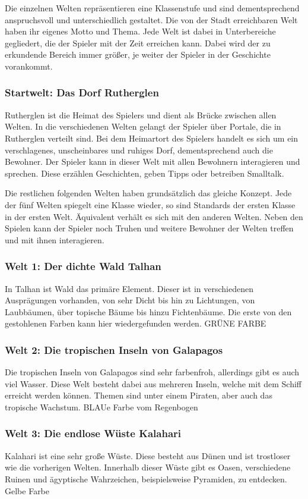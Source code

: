 Die einzelnen Welten repräsentieren eine Klassenstufe und sind dementsprechend anspruchsvoll und unterschiedlich gestaltet. Die von der Stadt erreichbaren Welt haben ihr eigenes Motto und Thema. Jede Welt ist dabei in Unterbereiche gegliedert, die der Spieler mit der Zeit erreichen kann. Dabei wird der zu erkundende Bereich immer größer, je weiter der Spieler in der Geschichte vorankommt. 

\subsubsection{Startwelt: Das Dorf Rutherglen}
	Rutherglen ist die Heimat des Spielers und dient als Brücke zwischen allen Welten. In die verschiedenen Welten gelangt der Spieler über Portale, die in Rutherglen verteilt sind. Bei dem Heimartort des Spielers handelt es sich um ein verschlagenes, unscheinbares und ruhiges Dorf, dementsprechend auch die Bewohner. Der Spieler kann in dieser Welt mit allen Bewohnern interagieren und sprechen. Diese erzählen Geschichten, geben Tipps oder betreiben Smalltalk.
	
	Die restlichen folgenden Welten haben grundsätzlich das gleiche Konzept. Jede der fünf Welten spiegelt eine Klasse wieder, so sind Standards der ersten Klasse in der ersten Welt. Äquivalent verhält es sich mit den anderen Welten. Neben den Spielen kann der Spieler noch Truhen und weitere Bewohner der Welten treffen und mit ihnen interagieren.
	
\subsubsection{Welt 1: Der dichte Wald Talhan}
	In Talhan ist Wald das primäre Element. Dieser ist in verschiedenen Ausprägungen vorhanden, von sehr Dicht bis hin zu Lichtungen, von Laubbäumen, über topische Bäume bis hinzu Fichtenbäume. Die erste von den gestohlenen Farben kann hier wiedergefunden werden. GRÜNE FARBE
	
\subsubsection{Welt 2: Die tropischen Inseln von Galapagos}
	Die tropischen Inseln von Galapagos sind sehr farbenfroh, allerdings gibt es auch viel Wasser. Diese Welt besteht dabei aus mehreren Inseln, welche mit dem Schiff erreicht werden können. Themen sind unter einem Piraten, aber auch das tropische Wachstum. BLAUe Farbe vom Regenbogen
	
\subsubsection{Welt 3: Die endlose Wüste Kalahari}
	Kalahari ist eine sehr große Wüste. Diese besteht aus Dünen und ist trostloser wie die vorherigen Welten. Innerhalb dieser Wüste gibt es Oasen, verschiedene Ruinen und ägyptische Wahrzeichen, beispielsweise Pyramiden, zu entdecken. Gelbe Farbe
	
